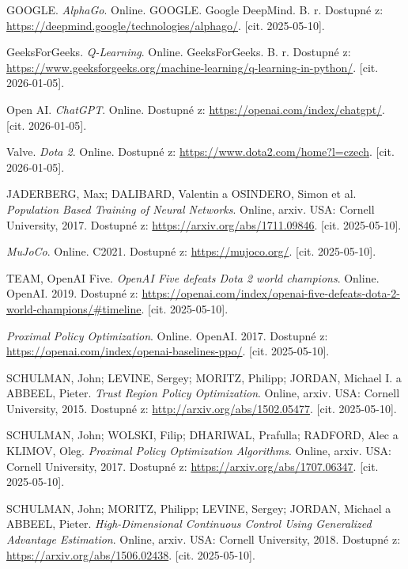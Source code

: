 GOOGLE. \textit{AlphaGo}. Online. GOOGLE. Google DeepMind. B. r. Dostupné z: \url{https://deepmind.google/technologies/alphago/}. [cit. 2025-05-10].

GeeksForGeeks. \textit{Q-Learning}. Online. GeeksForGeeks. B. r. Dostupné z: \url{https://www.geeksforgeeks.org/machine-learning/q-learning-in-python/}. [cit. 2026-01-05].

Open AI. \textit{ChatGPT}. Online. Dostupné z: \url{https://openai.com/index/chatgpt/}. [cit. 2026-01-05].

Valve. \textit{Dota 2}. Online. Dostupné z: \url{https://www.dota2.com/home?l=czech}. [cit. 2026-01-05].

JADERBERG, Max; DALIBARD, Valentin a OSINDERO, Simon et al. \textit{Population Based Training of Neural Networks}. Online, arxiv. USA: Cornell University, 2017. Dostupné z: \url{https://arxiv.org/abs/1711.09846}. [cit. 2025-05-10].

\textit{MuJoCo}. Online. C2021. Dostupné z: \url{https://mujoco.org/}. [cit. 2025-05-10].

TEAM, OpenAI Five. \textit{OpenAI Five defeats Dota 2 world champions}. Online. OpenAI. 2019. Dostupné z: \url{https://openai.com/index/openai-five-defeats-dota-2-world-champions/\#timeline}. [cit. 2025-05-10].

\textit{Proximal Policy Optimization}. Online. OpenAI. 2017. Dostupné z: \url{https://openai.com/index/openai-baselines-ppo/}. [cit. 2025-05-10].

SCHULMAN, John; LEVINE, Sergey; MORITZ, Philipp; JORDAN, Michael I. a ABBEEL, Pieter. \textit{Trust Region Policy Optimization}. Online, arxiv. USA: Cornell University, 2015. Dostupné z: \url{http://arxiv.org/abs/1502.05477}. [cit. 2025-05-10].

SCHULMAN, John; WOLSKI, Filip; DHARIWAL, Prafulla; RADFORD, Alec a KLIMOV, Oleg. \textit{Proximal Policy Optimization Algorithms}. Online, arxiv. USA: Cornell University, 2017. Dostupné z: \url{https://arxiv.org/abs/1707.06347}. [cit. 2025-05-10].

SCHULMAN, John; MORITZ, Philipp; LEVINE, Sergey; JORDAN, Michael a ABBEEL, Pieter. \textit{High-Dimensional Continuous Control Using Generalized Advantage Estimation}. Online, arxiv. USA: Cornell University, 2018. Dostupné z: \url{https://arxiv.org/abs/1506.02438}. [cit. 2025-05-10].

